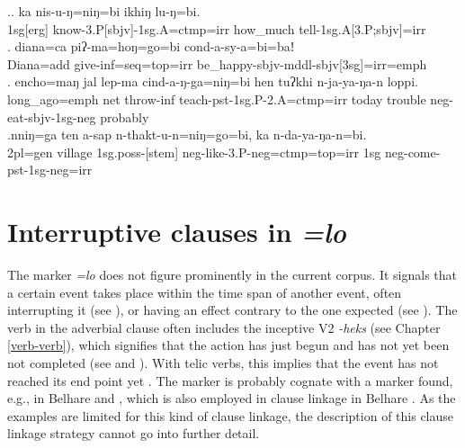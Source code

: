 \ex.\ag. ka nis-u-ŋ=niŋ=bi ikhiŋ lu-ŋ=bi.\\
	{\sc 1sg[erg]} 	know{\sc -3.P[sbjv]-1sg.A=ctmp=irr} how\_much tell{\sc -1sg.A[3.P;sbjv]=irr}\\
	 \bg. diana=ca  piʔ-ma=hoŋ=go=bi   cond-a-sy-a=bi=baǃ\\
	Diana{\sc =add} give{\sc -inf=seq=top=irr} be\_happy{\sc -sbjv-mddl-sbjv[3sg]=irr=emph}\\
	 
	\bg. encho=maŋ     jal lep-ma   cind-a-ŋ-ga=niŋ=bi     hen   tuʔkhi n-ja-ya-ŋa-n    loppi.\\
	long\_ago{\sc =emph} net throw{\sc -inf} teach{\sc -pst-1sg.P-2.A=ctmp=irr} today trouble {\sc neg-}eat{\sc -sbjv-1sg-neg} probably\\
	 
	\bg.nniŋ=ga ten a-sap n-thakt-u-n=niŋ=go=bi, ka n-da-ya-ŋa-n=bi.\\
	{\sc 2pl=gen} village {\sc 1sg.poss-[stem]} {\sc neg-}like{\sc -3.P-neg=ctmp=top=irr} {\sc 1sg} {\sc neg-}come{\sc -pst-1sg-neg=irr}\\

 

\section{Interruptive clauses in \emph{=lo}}\label{adv-cl-int}

The  marker \emph{=lo} does not figure prominently in the current corpus. It signals that a certain event takes place within the time span of another event, often interrupting it (see \Next[a]), or having an effect  contrary to the one expected (see \Next[b]). The verb in the adverbial clause often includes the inceptive V2 \emph{-heks} (see Chapter \ref{verb-verb}), which signifies that the action has just begun and has not yet been not completed (see \Next[a] and \Next[b]). With telic verbs, this implies that the event has not reached its end point yet \Next[c]. The marker is probably cognate with a  marker found, e.g., in Belhare and , which is also employed in clause linkage in Belhare \citep{Bickel1993Belhare, Doornenbal2009A-grammar}. As the examples are limited for this kind of clause linkage, the description of this clause linkage strategy cannot go into further detail.

